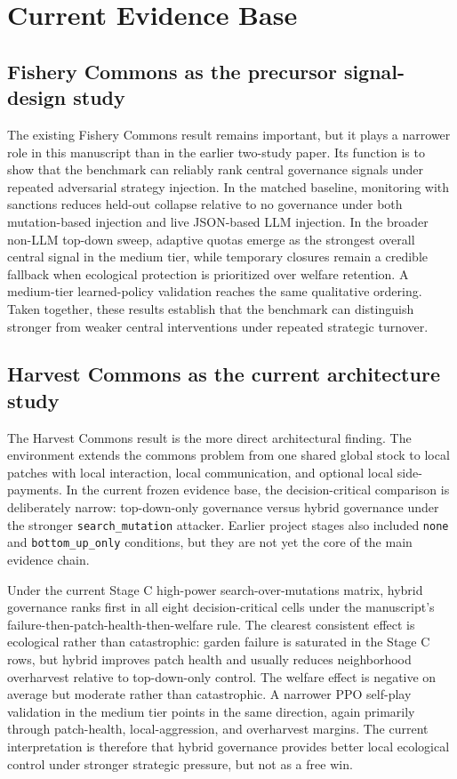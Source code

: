 \section{Current Evidence Base}

\subsection{Fishery Commons as the precursor signal-design study}

The existing Fishery Commons result remains important, but it plays a narrower role in this manuscript than in the earlier two-study paper. Its function is to show that the benchmark can reliably rank central governance signals under repeated adversarial strategy injection. In the matched baseline, monitoring with sanctions reduces held-out collapse relative to no governance under both mutation-based injection and live JSON-based LLM injection. In the broader non-LLM top-down sweep, adaptive quotas emerge as the strongest overall central signal in the medium tier, while temporary closures remain a credible fallback when ecological protection is prioritized over welfare retention. A medium-tier learned-policy validation reaches the same qualitative ordering. Taken together, these results establish that the benchmark can distinguish stronger from weaker central interventions under repeated strategic turnover.

\subsection{Harvest Commons as the current architecture study}

The Harvest Commons result is the more direct architectural finding. The environment extends the commons problem from one shared global stock to local patches with local interaction, local communication, and optional local side-payments. In the current frozen evidence base, the decision-critical comparison is deliberately narrow: top-down-only governance versus hybrid governance under the stronger \texttt{search\_mutation} attacker. Earlier project stages also included \texttt{none} and \texttt{bottom\_up\_only} conditions, but they are not yet the core of the main evidence chain.

Under the current Stage C high-power search-over-mutations matrix, hybrid governance ranks first in all eight decision-critical cells under the manuscript's failure-then-patch-health-then-welfare rule. The clearest consistent effect is ecological rather than catastrophic: garden failure is saturated in the Stage C rows, but hybrid improves patch health and usually reduces neighborhood overharvest relative to top-down-only control. The welfare effect is negative on average but moderate rather than catastrophic. A narrower PPO self-play validation in the medium tier points in the same direction, again primarily through patch-health, local-aggression, and overharvest margins. The current interpretation is therefore that hybrid governance provides better local ecological control under stronger strategic pressure, but not as a free win.


